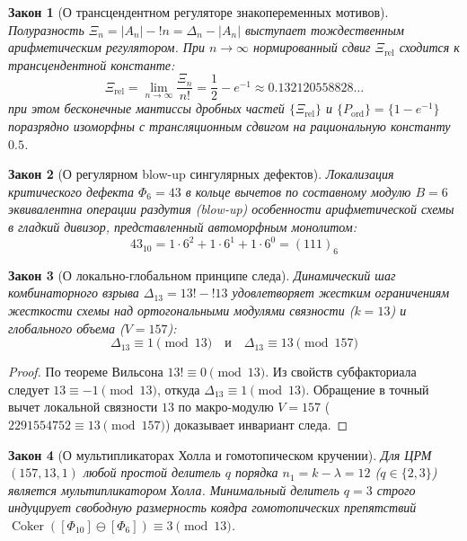 \documentclass[10pt,twocolumn]{article}
\DeclareMathOperator{\Coker}{Coker}
\newtheorem{law}{Закон}
\begin{document}
\begin{law}[О трансцендентном регуляторе знакопеременных мотивов]
Полуразность $\Xi_n = |A_n| - !n = \Delta_n - |A_n|$ выступает тождественным арифметическим регулятором. При $n \to \infty$ нормированный сдвиг $\Xi_{\text{rel}}$ сходится к трансцендентной константе:
\begin{equation}
\Xi_{\text{rel}} = \lim_{n \to \infty} \frac{\Xi_n}{n!} = \frac{1}{2} - e^{-1} \approx 0.132120558828\dots
\end{equation}
при этом бесконечные мантиссы дробных частей $\{ \Xi_{\text{rel}} \}$ и $\{ P_{\text{ord}} \} = \{ 1 - e^{-1} \}$ поразрядно изоморфны с трансляционным сдвигом на рациональную константу $0.5$.
\end{law}

\begin{law}[О регулярном blow-up сингулярных дефектов]
Локализация критического дефекта $\Phi_6 = 43$ в кольце вычетов по составному модулю $B=6$ эквивалентна операции раздутия (blow-up) особенности арифметической схемы в гладкий дивизор, представленный автоморфным монолитом:
\begin{equation}
43_{10} = 1 \cdot 6^2 + 1 \cdot 6^1 + 1 \cdot 6^0 = (111)_6
\end{equation}
\end{law}

\begin{law}[О локально-глобальном принципе следа]
Динамический шаг комбинаторного взрыва $\Delta_{13} = 13! - !13$ удовлетворяет жестким ограничениям жесткости схемы над ортогональными модулями связности ($k=13$) и глобального объема ($V=157$):
\begin{equation}
\Delta_{13} \equiv 1 \pmod{13} \quad \text{и} \quad \Delta_{13} \equiv 13 \pmod{157}
\end{equation}
\end{law}

\begin{proof}
По теореме Вильсона $13! \equiv 0 \pmod{13}$. Из свойств субфакториала следует $\!13 \equiv -1 \pmod{13}$, откуда $\Delta_{13} \equiv 1 \pmod{13}$. Обращение в точный вычет локальной связности $13$ по макро-модулю $V=157$ ($2291554752 \equiv 13 \pmod{157}$) доказывает инвариант следа.
\end{proof}

\begin{law}[О мультипликаторах Холла и гомотопическом кручении]
Для ЦРМ $(157, 13, 1)$ любой простой делитель $q$ порядка $n_1 = k - \lambda = 12$ ($q \in \{2, 3\}$) является мультипликатором Холла. Минимальный делитель $q=3$ строго индуцирует свободную размерность коядра гомотопических препятствий $\Coker([\Phi_{10}] \ominus [\Phi_6]) \equiv 3 \pmod{13}$.
\end{law}
\end{document}
